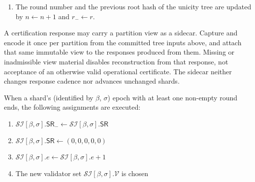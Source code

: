 \begin{enumerate}
\begin{enumerate}
		\item The last unicity certificate field is updated by $\mathcal{SI}[\beta,\sigma] UC_-\gets UC$ (if the shard input have changed).
	\end{enumerate}
	\item The round number and the previous root hash of the unicity tree are updated by $n\gets n+1$ and $r_-\gets r$.
\end{enumerate}

A certification response may carry a partition view as a sidecar. Capture and encode it once per partition from the committed tree inputs above, and attach that same immutable view to the responses produced from them. Missing or inadmissible view material disables reconstruction from that response, not acceptance of an otherwise valid operational certificate. The sidecar neither changes response cadence nor advances unchanged shards.

When a shard's (identified by $\beta$, $\sigma$) epoch with at least one non-empty round ends, the following assignments are executed:
\begin{enumerate}
	\item $\mathcal{SI}[\beta,\sigma].\mathsf{SR}_- \gets \mathcal{SI}[\beta,\sigma].\mathsf{SR}$
	\item $\mathcal{SI}[\beta,\sigma].\mathsf{SR} \gets (0,0,0,0,0)$
	\item $\mathcal{SI}[\beta,\sigma].e \gets \mathcal{SI}[\beta,\sigma].e + 1$
	\item The new validator set $\mathcal{SI}[\beta,\sigma].\mathcal{V}$ is chosen
\end{enumerate}
